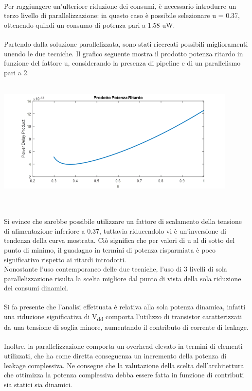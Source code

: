 \documentclass[11pt,  english, makeidx, a4paper, titlepage, oneside]{book}
\begin{document}
\\
Per raggiungere un'ulteriore riduzione dei consumi, è necessario introdurre un terzo livello di parallelizzazione: in questo caso è possibile selezionare u = 0.37, ottenendo quindi un consumo di potenza pari a 1.58 uW.
\\\\
Partendo dalla soluzione parallelizzata, sono stati ricercati possibili miglioramenti unendo le due tecniche. Il grafico seguente mostra il prodotto potenza ritardo in funzione del fattore u, considerando la presenza di pipeline e di un parallelismo pari a 2.
\\\\
\centerline{\includegraphics[width=12cm]{./img/Lab_3/prodotto_potenza_ritardo.png}}
\\\\
Si evince che sarebbe possibile utilizzare un fattore di scalamento della tensione di alimentazione inferiore a 0.37, tuttavia riducendolo vi è un'inversione di tendenza della curva mostrata. Ciò significa che per valori di u al di sotto del punto di minimo, il guadagno in termini di potenza risparmiata è poco significativo rispetto ai ritardi introdotti.
\\
Nonostante l'uso contemporaneo delle due tecniche, l'uso di 3 livelli di sola parallelizzazione risulta la scelta migliore dal punto di vista della sola riduzione dei consumi dinamici.
\\\\
Si fa presente che l'analisi effettuata è relativa alla sola potenza dinamica, infatti una riduzione significativa di V\textsubscript{dd} comporta l'utilizzo di transistor caratterizzati da una tensione di soglia minore, aumentando il contributo di corrente di leakage.
\\\\
Inoltre, la parallelizzazione comporta un overhead elevato in termini di elementi utilizzati, che ha come diretta conseguenza un incremento della potenza di leakage complessiva. Ne consegue che la valutazione della scelta dell'architettura che ottimizza la potenza complessiva debba essere fatta in funzione di contributi sia statici sia dinamici.
\end{document}
